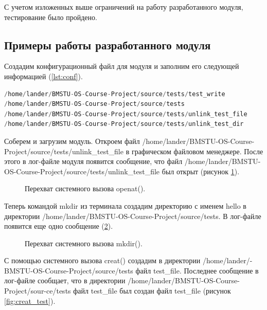 \documentclass[a4paper,14pt]{article}
\begin{document}
С учетом изложенных выше ограничений на работу разработанного модуля, тестирование было пройдено.


\subsection{Примеры работы разработанного модуля}

Создадим конфигурационный файл для модуля и заполним его следующей информацией (\ref{lst:conf}).

\newpage
\begin{lstlisting}[language=C++,label={lst:conf}, caption=\text{Заполняем конфигурационный файл.}]
/home/lander/BMSTU-OS-Course-Project/source/tests/test_write
/home/lander/BMSTU-OS-Course-Project/source/tests
/home/lander/BMSTU-OS-Course-Project/source/tests/unlink_test_file
/home/lander/BMSTU-OS-Course-Project/source/tests/unlink_test_dir
\end{lstlisting}

Соберем и загрузим модуль. Откроем файл /home/lander/BMSTU-OS-Course-Project/source/tests/unlink\_test\_file в графическом файловом менеджере. После этого в лог-файле модуля появится сообщение, что файл /home/lander/BMSTU-OS-Course-Project/source/tests/unlink\_test\_file был открыт (рисунок \ref{fig:openat_test}).

\begin{figure}[!h]
    \caption{Перехват системного вызова openat().}
    \label{fig:openat_test}
\end{figure}

Теперь командой mkdir из терминала создадим директорию с именем hello в директории /home/lander/BMSTU-OS-Course-Project/source/tests. В лог-файле появится еще одно сообщение (\ref{fig:mkdir_test}).

\begin{figure}[!h]
    \caption{Перехват системного вызова mkdir().}
    \label{fig:mkdir_test}
\end{figure}

С помощью системного вызова creat() создадим в директории /home/lander/-BMSTU-OS-Course-Project/source/tests файл test\_file. Последнее сообщение в лог-файле сообщает, что в директории /home/lander/BMSTU-OS-Course-Project/sour-ce/tests файл test\_file был создан файл test\_file (рисунок \ref{fig:creat_test}).
\end{document}
